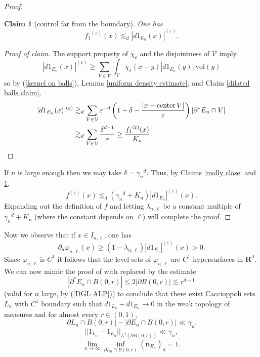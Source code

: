\documentclass[reqno,12pt,letterpaper]{amsart}
\newcommand{\RR}{\mathbf{R}}
\DeclareMathOperator{\cent}{center}
\newcommand{\normal}{\mathbf n}
\newcommand{\vol}{\mathrm{vol}}
\newtheorem{claim}[theorem]{Claim}
\theoremstyle{definition}
\numberwithin{equation}{section}
\begin{document}
\begin{proof}
\begin{claim}[control far from the boundary]\label{molly far}
One has
$${f_1}^{(\varepsilon)}(x) \lesssim_d |d1_{E_n}(x)|^{(\varepsilon)}.$$
\end{claim}
\begin{proof}[Proof of claim]
The support property of $\chi_\varepsilon$ and the disjointness of $\mathcal V$ imply
$$|d1_{E_n}(x)|^{(\varepsilon)} \geq \sum_{V \in \mathcal V} \int_V \chi_\varepsilon(x - y) |d1_{E_n}(y)| ~\vol(y)$$
so by (\ref{kernel on balls}), Lemma \ref{uniform density estimate}, and Claim \ref{dilated balls claim},
\begin{align*}
|d1_{E_n}(x)|^{(\varepsilon)} &\gtrsim_d \sum_{V \in \mathcal V} \varepsilon^{-d} \left(1 - \delta - \frac{|x - \cent V|}{\varepsilon}\right) |\partial^* E_n \cap V|\\
& \gtrsim_d \sum_{V \in \mathcal V} \frac{\delta^{d - 1}}{\varepsilon} \geq \frac{{f_1}^{(\varepsilon)}(x)}{K_n}. \qedhere
\end{align*}
\end{proof}

If $n$ is large enough then we may take $\delta = {\gamma_n}^d$. Thus, by Claims \ref{molly close} and \ref{molly far},
$$f^{(\varepsilon)}(x) \lesssim_d ({\gamma_n}^d + K_n)|d1_{E_n}|^{(\varepsilon)}(x).$$
Expanding out the definition of $f$ and letting $\lambda_{n,\ell}$ be a constant multiple of ${\gamma_n}^d + K_n$ (where the constant depends on $\ell$) will complete the proof.
\end{proof}

Now we observe that if $x \in I_{n, \ell}$, one has
$$\partial_d \varphi_{n,\ell}(x) \geq (1 - \lambda_{n, \ell}) |d1_{E_n}|^{(\varepsilon)}(x) > 0.$$
Since $\varphi_{n, \ell}$ is $C^1$ it follows that the level sets of $\varphi_{n, \ell}$ are $C^1$ hypersurfaces in $\RR^d$.
We can now mimic the proof of \cite[(7.22--7.23)]{Giusti77} with \cite[(5.14)]{Giusti77} replaced by the estimate
\begin{equation}\label{Giusti514}
|\partial^* E_n \cap B(0, r)| \leq 2|\partial B(0, r)| \lesssim r^{d - 1}
\end{equation}
(valid for $n$ large, by (\ref{DGL ALP})) to conclude that there exist Caccioppoli sets $L_n$ with $C^1$ boundary such that $d1_{L_n} - d1_{E_n} \to 0$ in the weak topology of measures and for almost every $r \in (0, 1)$,
\begin{equation}\label{Giusti722}
|\partial L_n \cap B(0, r)| - |\partial E_n \cap B(0, r)| \ll \gamma_n,
\end{equation}
\begin{equation}\label{Giusti723}
||1_{L_n} - 1_{E_n}||_{L^1(\partial B(0, r))} \ll \gamma_n,
\end{equation}
\begin{equation}\label{Giusti717}
\lim_{n \to \infty} \inf_{\partial L_n \cap B(0, r)} (\normal_{E_n})_d = 1.
\end{equation}
\end{document}
